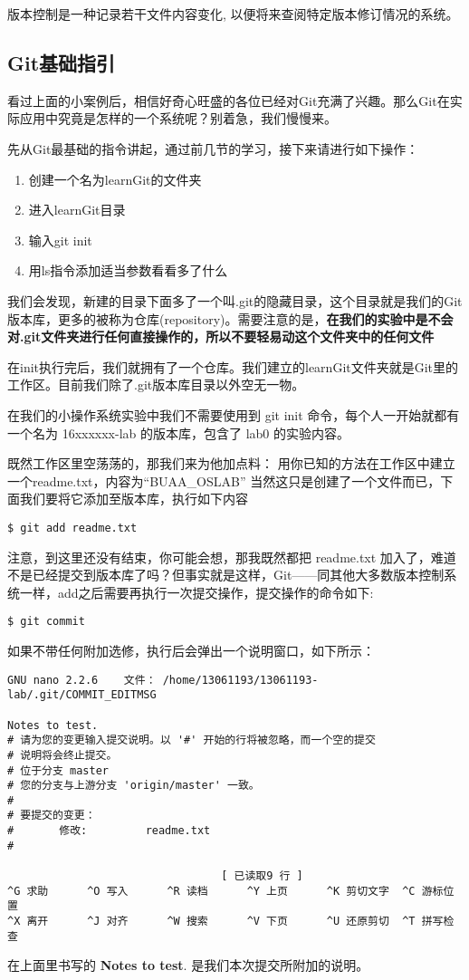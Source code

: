 \begin{note}
版本控制是一种记录若干文件内容变化, 以便将来查阅特定版本修订情况的系统。
\end{note}

\subsection{Git基础指引}
看过上面的小案例后，相信好奇心旺盛的各位已经对Git充满了兴趣。那么Git在实际应用中究竟是怎样的一个系统呢？别着急，我们慢慢来。

先从Git最基础的指令讲起，通过前几节的学习，接下来请进行如下操作：
\begin{enumerate}
    \item 创建一个名为learnGit的文件夹
    \item 进入learnGit目录
	\item 输入git init
	\item 用ls指令添加适当参数看看多了什么
\end{enumerate}
我们会发现，新建的目录下面多了一个叫.git的隐藏目录，这个目录就是我们的Git版本库，更多的被称为仓库(repository)。需要注意的是，\textbf{在我们的实验中是不会对.git文件夹进行任何直接操作的，所以不要轻易动这个文件夹中的任何文件}

在init执行完后，我们就拥有了一个仓库。我们建立的learnGit文件夹就是Git里的工作区。目前我们除了.git版本库目录以外空无一物。

\begin{note}
在我们的小操作系统实验中我们不需要使用到 git init 命令，每个人一开始就都有一个名为 16xxxxxx-lab 的版本库，包含了 lab0 的实验内容。
\end{note}
既然工作区里空荡荡的，那我们来为他加点料：
用你已知的方法在工作区中建立一个readme.txt，内容为“BUAA\_OSLAB”
当然这只是创建了一个文件而已，下面我们要将它添加至版本库，执行如下内容
\begin{verbatim}
$ git add readme.txt
\end{verbatim}
注意，到这里还没有结束，你可能会想，那我既然都把 readme.txt 加入了，难道不是已经提交到版本库了吗？但事实就是这样，Git——同其他大多数版本控制系统一样，add之后需要再执行一次提交操作，提交操作的命令如下:
\begin{verbatim}
$ git commit
\end{verbatim}
如果不带任何附加选修，执行后会弹出一个说明窗口，如下所示：
\begin{verbatim}
GNU nano 2.2.6    文件： /home/13061193/13061193-lab/.git/COMMIT_EDITMSG              

Notes to test.
# 请为您的变更输入提交说明。以 '#' 开始的行将被忽略，而一个空的提交
# 说明将会终止提交。
# 位于分支 master
# 您的分支与上游分支 'origin/master' 一致。
#
# 要提交的变更：
#       修改:         readme.txt
#

                                 [ 已读取9 行 ]
^G 求助      ^O 写入      ^R 读档      ^Y 上页      ^K 剪切文字  ^C 游标位置
^X 离开      ^J 对齐      ^W 搜索      ^V 下页      ^U 还原剪切  ^T 拼写检查
\end{verbatim}
在上面里书写的 \textbf{Notes to test}. 是我们本次提交所附加的说明。

